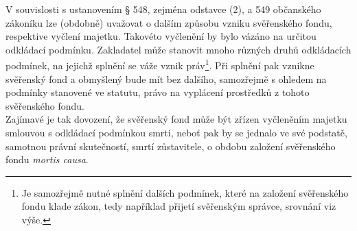 \documentclass{article}
\begin{document}

V souvislosti s ustanovením § 548, zejména odstavce (2), a 549 občanského zákoníku lze (obdobně) uvažovat o dalším způsobu vzniku svěřenského fondu, respektive vyčlení majetku. Takovéto vyčlenění by bylo vázáno na určitou odkládací podmínku. Zakladatel může stanovit mnoho různých druhů odkládacích podmínek, na jejichž splnění se váže vznik práv\footnote{Je samozřejmě nutné splnění dalších podmínek, které na založení svěřenského fondu klade zákon, tedy například přijetí svěřenským správce, srovnání viz výše.}. Při splnění pak vznikne svěřenský fond a obmyšlený bude mít bez dalšího, samozřejmě s ohledem na podmínky stanovené ve statutu, právo na vyplácení prostředků z tohoto svěřenského fondu.\\ 



Zajímavé je tak dovození, že svěřenský fond může být zřízen vyčleněním majetku smlouvou s odkládací podmínkou smrti, neboť pak by se jednalo ve své podstatě, samotnou právní skutečností, smrtí zůstavitele, o obdobu založení svěřenského fondu \textit{mortis causa}.\\
\end{document}

